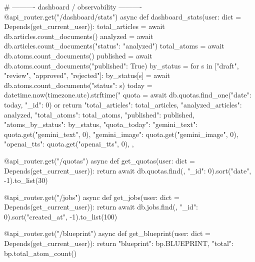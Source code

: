 # ---------- dashboard / observability ----------
@api_router.get("/dashboard/stats")
async def dashboard_stats(user: dict = Depends(get_current_user)):
    total_articles = await db.articles.count_documents({})
    analyzed = await db.articles.count_documents({"status": "analyzed"})
    total_atoms = await db.atoms.count_documents({})
    published = await db.atoms.count_documents({"published": True})
    by_status = {}
    for s in ["draft", "review", "approved", "rejected"]:
        by_status[s] = await db.atoms.count_documents({"status": s})
    today = datetime.now(timezone.utc).strftime("%
    quota = await db.quotas.find_one({"date": today}, {"_id": 0}) or {}
    return {
        "total_articles": total_articles,
        "analyzed_articles": analyzed,
        "total_atoms": total_atoms,
        "published": published,
        "atoms_by_status": by_status,
        "quota_today": {
            "gemini_text": quota.get("gemini_text", 0),
            "gemini_image": quota.get("gemini_image", 0),
            "openai_tts": quota.get("openai_tts", 0),
        },
    }


@api_router.get("/quotas")
async def get_quotas(user: dict = Depends(get_current_user)):
    return await db.quotas.find({}, {"_id": 0}).sort("date", -1).to_list(30)


@api_router.get("/jobs")
async def get_jobs(user: dict = Depends(get_current_user)):
    return await db.jobs.find({}, {"_id": 0}).sort("created_at", -1).to_list(100)


@api_router.get("/blueprint")
async def get_blueprint(user: dict = Depends(get_current_user)):
    return {"blueprint": bp.BLUEPRINT, "total": bp.total_atom_count()}


